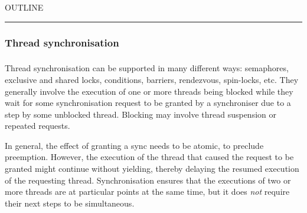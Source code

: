 


    OUTLINE
  \tableofcontents
\begin{center}
\rule{3in}{0.4pt}
\end{center}

\subsubsection{Thread synchronisation}\hypertarget{thread-synchronisation}{}\label{thread-synchronisation}

\begin{align*}
  [ \
  \textsf{Syncs
          } \ & \textsf{} \\
  \KEY{Datatype} \quad & \NAMEREF{syncs} \\
  \KEY{Funcon} \quad & \NAMEREF{sync-create} \\
  \KEY{Funcon} \quad & \NAMEREF{sync-feature} \\
  \KEY{Funcon} \quad & \NAMEREF{is-sync-feature} \\
  \textsf{Sync} \ & \textsf{features} \\
  \KEY{Datatype} \quad & \NAMEREF{sync-features} \\
  \KEY{Funcon} \quad & \NAMEREF{sync-waiting-list} \\
  \KEY{Funcon} \quad & \NAMEREF{sync-held} \\
  \KEY{Funcon} \quad & \NAMEREF{sync-holder} \\
  \KEY{Funcon} \quad & \NAMEREF{sync-count} \\
  \KEY{Funcon} \quad & \NAMEREF{sync-feature-create}
  \ ]
\end{align*}
Thread synchronisation can be supported in many different ways: semaphores,
exclusive and shared locks, conditions, barriers, rendezvous, spin-locks, etc.
They generally involve the execution of one or more threads being blocked
while they wait for some synchronisation request to be granted by a synchroniser
due to a step by some unblocked thread. Blocking may involve thread suspension
or repeated requests.

In general, the effect of granting a sync needs to be atomic, to
preclude preemption. However, the execution of the thread that caused the
request to be granted might continue without yielding, thereby delaying the
resumed execution of the requesting thread. Synchronisation ensures that the
executions of two or more threads are at particular points at the same time,
but it does \emph{not} require their next steps to be simultaneous.

